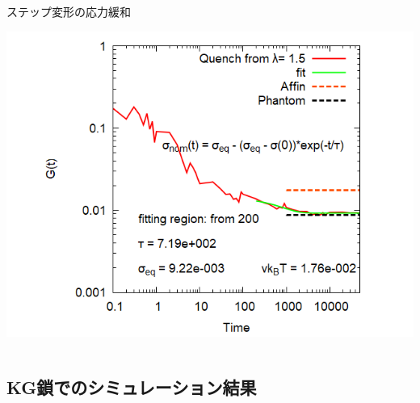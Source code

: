 \documentclass[12pt, dvipdfmx]{beamer}
\begin{document}
\begin{frame}
\begin{columns}[totalwidth=\linewidth]
\begin{exampleblock}{ステップ変形の応力緩和}
\begin{itemize}
                    \end{itemize}
					\begin{center}
                        \includegraphics[width=.9\columnwidth]{gt_sunuke.png}
                    \end{center}
				\end{exampleblock}
		\end{columns}
\end{frame}

\subsection{KG鎖でのシミュレーション結果}

				
						
\end{document}
